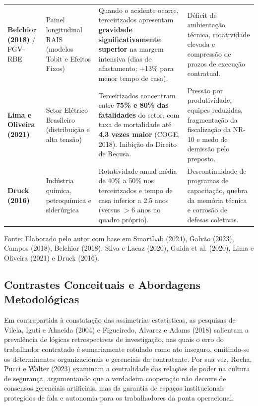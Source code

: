 \documentclass[12pt,a4paper]{article}
\begin{document}
\begin{table}[htbp]
\begin{tabularx}{\textwidth}{p{2.6cm}p{2.3cm}Xp{3.5cm}}
\addlinespace
\textbf{Belchior (2018)} / FGV-RBE & Painel longitudinal RAIS (modelos Tobit e Efeitos Fixos) & Quando o acidente ocorre, terceirizados apresentam \textbf{gravidade significativamente superior} na margem intensiva (dias de afastamento; +13\% para menor tempo de casa). & Déficit de ambientação técnica, rotatividade elevada e compressão de prazos de execução contratual. \\
\addlinespace
\textbf{Lima e Oliveira (2021)} & Setor Elétrico Brasileiro (distribuição e alta tensão) & Terceirizados concentram entre \textbf{75\% e 80\% das fatalidades} do setor, com taxa de mortalidade até \textbf{4,3 vezes maior} (COGE, 2018). Inibição do Direito de Recusa. & Pressão por produtividade, equipes reduzidas, fragmentação da fiscalização da NR-10 e medo de demissão pelo preposto. \\
\addlinespace
\textbf{Druck (2016)} & Indústria química, petroquímica e siderúrgica & Rotatividade anual média de 40\% a 50\% nos terceirizados e tempo de casa inferior a 2,5 anos (versus $>6$ anos no quadro próprio). & Descontinuidade de programas de capacitação, quebra da memória técnica e corrosão de defesas coletivas. \\
\bottomrule
\end{tabularx}
\begin{flushleft}
\footnotesize Fonte: Elaborado pelo autor com base em SmartLab (2024), Galvão (2023), Campos (2018), Belchior (2018), Silva e Lacaz (2020), Guida et al. (2020), Lima e Oliveira (2021) e Druck (2016).
\end{flushleft}
\end{table}

\subsection{Contrastes Conceituais e Abordagens Metodológicas}

Em contrapartida à constatação das assimetrias estatísticas, as pesquisas de Vilela, Iguti e Almeida (2004) e Figueiredo, Alvarez e Adams (2018) salientam a prevalência de lógicas retrospectivas de investigação, nas quais o erro do trabalhador contratado é sumariamente rotulado como ato inseguro, omitindo-se os determinantes organizacionais e gerenciais da contratante. Por sua vez, Rocha, Pucci e Walter (2023) examinam a centralidade das relações de poder na cultura de segurança, argumentando que a verdadeira cooperação não decorre de consensos gerenciais artificiais, mas da garantia de espaços institucionais protegidos de fala e autonomia para os trabalhadores da ponta operacional.
\end{document}
